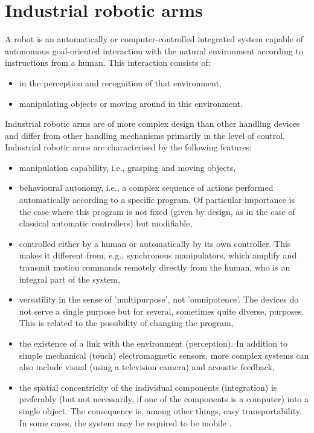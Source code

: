\section{Industrial robotic arms}

A robot is an automatically or computer-controlled integrated system capable of autonomous goal-oriented interaction with the natural environment according to instructions from a human. This
interaction consists of:

\begin{itemize}

    \item in the perception and recognition of that environment,
    \item manipulating objects or moving around in this environment. 

\end{itemize}

 Industrial robotic arms are of more complex design than other handling devices and differ from other handling mechanisms primarily in the level of control.  Industrial robotic arms are characterised by the following features:
 
\begin{itemize}
 
    \item  manipulation capability, i.e., grasping and moving objects, 
    \item behavioural autonomy, i.e., a complex sequence of actions performed automatically according to a specific program. Of particular importance is the case where this program is not fixed (given by design, as in the case of classical automatic controllers) but modifiable,
    \item controlled either by a human or automatically by its own controller.  This makes it different from, e.g., synchronous manipulators, which amplify and transmit motion commands remotely directly from the human, who is an integral part of the system,
    \item versatility in the sense of 'multipurpose', not 'omnipotence'. The devices do not serve a single purpose but for several, sometimes quite diverse, purposes. This is related to the possibility of changing the program,
    \item the existence of a link with the environment (perception). In addition to simple mechanical (touch) electromagnetic sensors, more complex systems can also include visual (using a television camera) and acoustic feedback,
    \item the spatial concentricity of the individual components (integration) is preferably (but not necessarily, if one of the components is a computer) into a single object. The consequence is, among other things, easy transportability. In some cases, the system may be required to be mobile \cite{vsb_2007}.

\end{itemize}

